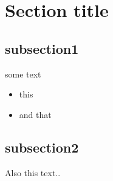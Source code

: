 \section{Section title}
\subsection{subsection1}
some text
\begin{itemize}
\item this
\item and that
\end{itemize}
\subsection{subsection2}
Also this text..

